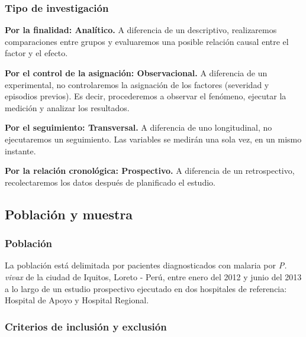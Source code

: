 \documentclass[a4paper]{article}
\begin{document}
\subsubsection{Tipo de investigación}\label{tipo-de-investigacion}

\textbf{Por la finalidad: Analítico.} A diferencia de un descriptivo,
realizaremos comparaciones entre grupos y evaluaremos una posible
relación causal entre el factor y el efecto.

\textbf{Por el control de la asignación: Observacional.} A diferencia de
un experimental, no controlaremos la asignación de los factores
(severidad y episodios previos). Es decir, procederemos a observar el
fenómeno, ejecutar la medición y analizar los resultados.

\textbf{Por el seguimiento: Transversal.} A diferencia de uno
longitudinal, no ejecutaremos un seguimiento. Las variables se medirán
una sola vez, en un mismo instante.

\textbf{Por la relación cronológica: Prospectivo.} A diferencia de un
retrospectivo, recolectaremos los datos después de planificado el
estudio.

\subsection{Población y muestra}\label{poblacion-y-muestra}

\subsubsection{Población}\label{poblacion}

La población está delimitada por pacientes diagnosticados con malaria
por \emph{P. vivax} de la ciudad de Iquitos, Loreto - Perú, entre enero
del 2012 y junio del 2013 a lo largo de un estudio prospectivo ejecutado
en dos hospitales de referencia: Hospital de Apoyo y Hospital Regional.

\subsubsection{Criterios de inclusión y
exclusión}\label{criterios-de-inclusion-y-exclusion}
\end{document}
